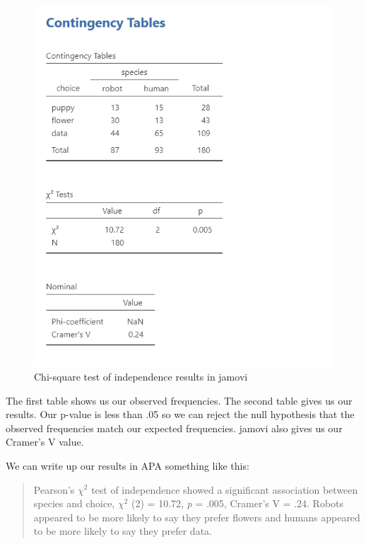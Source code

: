 \documentclass[
]{book}
\begin{document}
\begin{figure}

{\centering \includegraphics[width=1\linewidth]{images/11-independence/independence_results} 

}

\caption{Chi-square test of independence results in jamovi}\label{fig:unnamed-chunk-3}
\end{figure}

The first table shows us our observed frequencies. The second table gives us our results. Our p-value is less than .05 so we can reject the null hypothesis that the observed frequencies match our expected frequencies. jamovi also gives us our Cramer's V value.

We can write up our results in APA something like this:

\begin{quote}
Pearson's \(\chi^2\) test of independence showed a significant association between species and choice, \(\chi^2\) (2) = 10.72, \emph{p} = .005, Cramer's V = .24. Robots appeared to be more likely to say they prefer flowers and humans appeared to be more likely to say they prefer data.
\end{quote}
\end{document}
